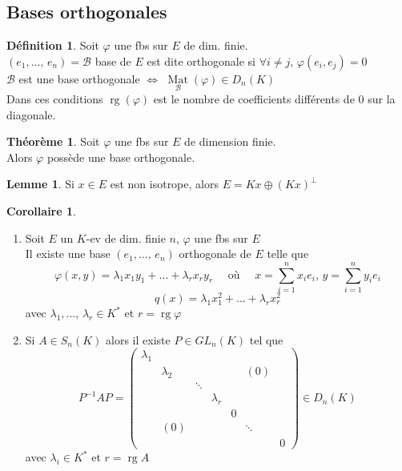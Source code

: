 \documentclass[10pt,a4paper]{article}
\theoremstyle{definition}
\newtheorem{theorem}[proposition]{Théorème}
\newtheorem{corollary}[proposition]{Corollaire}
\newtheorem{lemma}[proposition]{Lemme}
\newtheorem{definition}[proposition]{Définition}
\DeclareMathOperator*{\mat}{Mat}
\DeclareMathOperator{\rg}{rg}
\begin{document}
\subsection{Bases orthogonales}
\begin{definition}
    Soit \(\varphi\) une fbs sur \(E\) de dim. finie. \\
    \((e_1, ...,\, e_n) = \mathcal{B}\) base de \(E\) est dite orthogonale si \(\forall i \neq j,\, \varphi(e_i, e_j) = 0\) \\
    \(\mathcal{B}\) est une base orthogonale \(\iff\) \(\mat\limits_{\mathcal{B}}(\varphi) \in D_n(K)\) \\
    Dans ces conditions \(\rg(\varphi)\) est le nombre de coefficients différents de 0 sur la diagonale.
\end{definition}
\begin{theorem}
    Soit \(\varphi\) une fbs sur \(E\) de dimension finie. \\
    Alors \(\varphi\) possède une base orthogonale.
\end{theorem}
\begin{lemma}
    Si \(x \in E\) est non isotrope, alors \(E = Kx \oplus (Kx)^\perp\)
\end{lemma}

\pagebreak

\begin{corollary}
    \hfill
    \begin{enumerate}
        \item Soit \(E\) un \(K\)-ev de dim. finie \(n\), \(\varphi\) une fbs sur \(E\) \\
        Il existe une base \((e_1, ...,\, e_n)\) orthogonale de \(E\) telle que
        \[\varphi(x, y) = \lambda_1 x_1 y_1 + ... + \lambda_r x_r y_r \quad \text{ où } \quad x = \sum_{i = 1}^{n} x_i e_i,\, y = \sum_{i = 1}^{n} y_i e_i\]
        \[q(x) = \lambda_1 x_1^2 + ... + \lambda_r x_r^2 \]
        avec \(\lambda_1, ...,\, \lambda_r \in K^*\) et \(r = \rg \varphi\)
        \item Si \(A \in S_n(K)\) alors il existe \(P \in GL_n(K)\) tel que
        \[P^{-1}AP = \begin{pmatrix}
            \lambda_1 & & & & & & \\
            & \lambda_2 & & & & (0) & \\
            & & \ddots & & & & \\
            & & & \lambda_r & & & \\
            & & & & 0 & & \\
            & (0) & & & & \ddots & \\
            & & & & & & 0
        \end{pmatrix} \in D_n(K)\]
        avec \(\lambda_i \in K^*\) et \(r = \rg A\)
    \end{enumerate}
\end{corollary}
\end{document}

